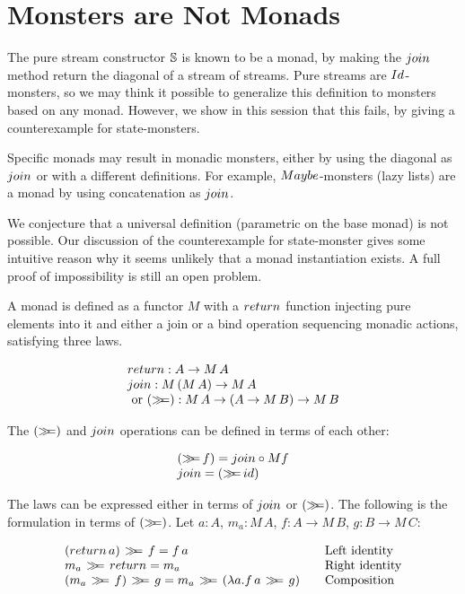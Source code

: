 \section{Monsters are Not Monads}\label{sec:monad}

The pure stream constructor $\mathbb{S}$ is known to be a monad, by making the $\join$ method return the diagonal of a stream of streams.
Pure streams are $\Id$-monsters, so we may think it possible to generalize this definition to monsters based on any monad.
However, we show in this session that this fails, by giving a counterexample for state-monsters.

Specific monads may result in monadic monsters, either by using the diagonal as $\join$ or with a different definitions.
For example, $\maybe$-monsters (lazy lists) are a monad by using concatenation as $\join$.

We conjecture that a universal definition (parametric on the base monad) is not possible.
Our discussion of the counterexample for state-monster gives some intuitive reason why it seems unlikely that a monad instantiation exists.
A full proof of impossibility is still an open problem.

A monad is defined as a functor $M$ with a $\return$ function injecting pure elements into it and either a join or a bind operation sequencing monadic actions, satisfying three laws.

$$
\begin{array}{l}
\return : A \rightarrow M\, A \\
\join : M\,(M\, A) \rightarrow M\, A\\
\mbox{ or }
(\bind) : M\, A \rightarrow (A \rightarrow M\, B) \rightarrow M\, B
\end{array}
$$

The $(\mathbin{\gg\!\!=})$ and $\join$ operations can be defined in terms of each other:

$$
\begin{array}{l}
(\bind\, f) = \join \comp M f \\
\join = (\bind\,\id)
\end{array}
$$

The laws can be expressed either in terms of $\join$ or $(\mathbin{\gg\!\!=})$.
The following is the formulation in terms of $(\mathbin{\gg\!\!=})$.
Let $a:A$, $m_a : M\, A$,
$f : A \rightarrow M\, B$, $g : B \rightarrow M\,C$:

$$
\begin{array}{l@{\qquad}l}
(\return\, a)\, \bind \, f = f\, a
  & \mbox{Left identity} \\
m_a\, \bind \, \return = m_a
  & \mbox{Right identity} \\
(m_a \, \bind \, f)\, \bind \, g = m_a\, \bind\, (\lambda a.  f\, a \, \bind \, g)
  & \mbox{Composition} \\
\end{array}
$$

